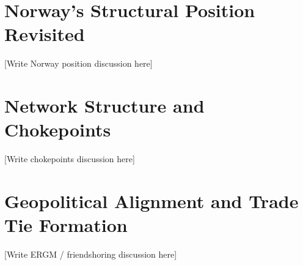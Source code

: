 
\section{Norway's Structural Position Revisited}
\label{sec:disc_norway}


[Write Norway position discussion here]

\section{Network Structure and Chokepoints}
\label{sec:disc_chokepoints}


[Write chokepoints discussion here]

\section{Geopolitical Alignment and Trade Tie Formation}
\label{sec:disc_ergm}


[Write ERGM / friendshoring discussion here]
